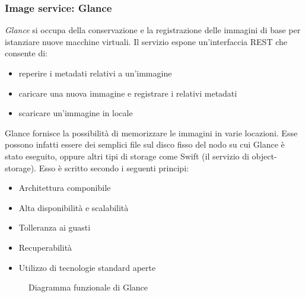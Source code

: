 \documentclass[../main.tex]{subfiles}
\begin{document}
\subsubsection{Image service: Glance}
\textit{Glance} si occupa della conservazione e la registrazione delle immagini di base per istanziare nuove macchine virtuali.
Il servizio espone un'interfaccia REST che consente di:
\begin{itemize}
\item reperire i metadati relativi a un'immagine
\item caricare una nuova immagine e registrare i relativi metadati
\item scaricare un'immagine in locale
\end{itemize}
Glance fornisce la possibilità di memorizzare le immagini in varie locazioni. Esse possono infatti essere dei semplici file sul disco fisso del nodo su cui Glance è stato eseguito, oppure altri tipi di storage come Swift (il servizio di object-storage).
Esso è scritto secondo i seguenti principi:
\begin{itemize}
\item Architettura componibile
\item Alta disponibilità e scalabilità
\item Tolleranza ai guasti
\item Recuperabilità
\item Utilizzo di tecnologie standard aperte
\end{itemize}
\begin{figure}[H]
\centering
{}
\caption{Diagramma funzionale di Glance \cite{openstackarch}}\label{openstackglance}
\end{figure}
\end{document}
